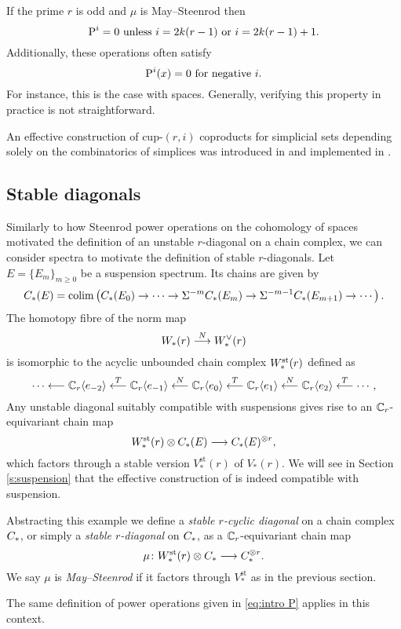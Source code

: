 If the prime $r$ is odd and $\mu$ is May--Steenrod then
\[
\operatorname{P}^i = 0 \text{ unless } i = 2k(r-1) \text{ or }i = 2k(r-1)+1.
\]
Additionally, these operations often satisfy
\[
\operatorname{P}^i(x) = 0 \text{ for negative } i.
\]
For instance, this is the case with spaces.
Generally, verifying this property in practice is not straightforward.

An effective construction of cup-$(r,i)$ coproducts for simplicial sets depending solely on the combinatorics of simplices was introduced in \cite{medina2021may_st} and implemented in \cite{medina2021comch}.

\subsection{Stable diagonals}

Similarly to how Steenrod power operations on the cohomology of spaces motivated the definition of an unstable $r$-diagonal on a chain complex, we can consider spectra to motivate the definition of stable $r$-diagonals. Let $E = \{E_m\}_{m \geq 0}$ be a suspension spectrum. Its chains are given by
\[
C_{*}(E) = \operatorname*{colim} \left(C_{*}(E_0) \to \dots \to \Sigma^{-m}C_{*}(E_m) \to \Sigma^{-m-1} C_{*}(E_{m+1}) \to \dotsb\right).
\]
The homotopy fibre of the norm map
\[
W_{*}(r) \overset{N}{\longrightarrow} W^\vee_{*}(r)
\]
is isomorphic to the acyclic unbounded chain complex $W^{\mathrm{st}}_{*}(r)$ defined as
\[
\dotsb \longleftarrow \mathbb{C}_r\langle e_{-2}\rangle
\overset{T}{\longleftarrow}
\mathbb{C}_r\langle e_{-1}\rangle
\overset{N}{\longleftarrow}
\mathbb{C}_r\langle e_0\rangle
\overset{T}{\longleftarrow}
\mathbb{C}_r\langle e_{1}\rangle
\overset{N}{\longleftarrow}
\mathbb{C}_r\langle e_{2}\rangle
\overset{T}{\longleftarrow}
\dotsb,
\]
Any unstable diagonal suitably compatible with suspensions gives rise to an $\mathbb{C}_r$-equivariant chain map
\[
W^{\mathrm{st}}_{*}(r) \otimes C_{*}(E) \longrightarrow C_{*}(E)^{\otimes r},
\]
which factors through a stable version $V_*^\mathrm{st}(r)$ of $V_*(r)$. We will see in Section \ref{s:suspension} that the effective construction of \cite{medina2021may_st} is indeed compatible with suspension.


Abstracting this example we define a \emph{stable $r$-cyclic diagonal} on a chain complex $C_{*}$, or simply a \textit{stable $r$-diagonal} on $C_{*}$, as a $\mathbb{C}_r$-equivariant chain map
\[
\mu \colon W^{\mathrm{st}}_{*}(r) \otimes C_{*} \longrightarrow C_{*}^{\otimes r}.
\]
We say $\mu$ is \textit{May--Steenrod} if it factors through $V_*^\mathrm{st}$ as in the previous section.

The same definition of power operations given in \cref{eq:intro P} applies in this context.


